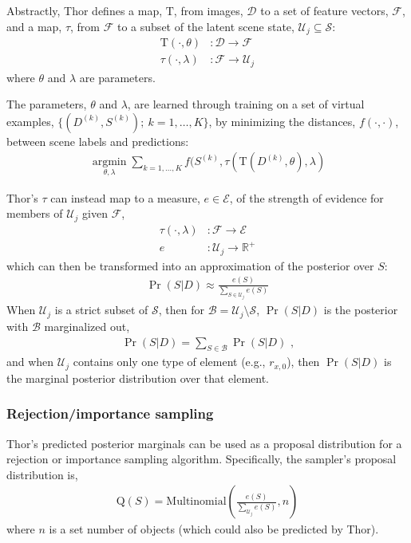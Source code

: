 \documentclass[]{report}
\begin{document}
Abstractly, Thor defines a map, $\mathrm{T}$, from images,
$\mathcal{D}$ to a set of feature vectors, $\mathcal{F}$, and a map,
$\tau$, from $\mathcal{F}$ to a subset of the latent scene state,
$\mathcal{U}_j \subseteq \mathcal{S}$:
\begin{align*}
  \mathrm{T}(\cdot, \theta) &: \mathcal{D} \rightarrow \mathcal{F}\\
  \tau(\cdot, \lambda) &: \mathcal{F} \rightarrow \mathcal{U}_j
\end{align*}
where $\theta$ and $\lambda$ are parameters.

The parameters, $\theta$ and $\lambda$, are learned through training
on a set of virtual examples, $\{(D^{(k)}, S^{(k)});\ k=1, \dots,
K\}$, by minimizing the distances, $f(\cdot,\cdot)$, between scene
labels and predictions:
\begin{align*}
  \underset{\theta, \lambda}{\operatorname{argmin}} \sum_{k=1, \dots, K}
  f(S^{(k)}, \tau(\mathrm{T}(D^{(k)}, \theta), \lambda)
\end{align*}

Thor's $\tau$ can instead map to a measure, $e \in \mathcal{E}$, of
the strength of evidence for members of $\mathcal{U}_j$ given
$\mathcal{F}$,
\begin{align*}
  \tau(\cdot, \lambda) &: \mathcal{F} \rightarrow \mathcal{E}\\
  e &: \mathcal{U}_j \rightarrow \mathbb{R}^+
\end{align*}
which can then be transformed into an approximation of the posterior
over $S$:
\begin{align*}
  \Pr(S|D) \approx \frac{e(S)}{\sum_{S \in \mathcal{U}_j} e(S)}
\end{align*}
When $\mathcal{U}_j$ is a strict subset of $\mathcal{S}$, then for
$\mathcal{B} = \mathcal{U}_j \setminus \mathcal{S}$, $\Pr(S|D)$ is the
posterior with $\mathcal{B}$ marginalized out,
\begin{align*}
  \Pr(S|D) = \sum_{S \in \mathcal{B}} \Pr(S|D) \text{ ,}
\end{align*}
and when $\mathcal{U}_j$ contains only one type of element (e.g.,
$r_{x,0}$), then $\Pr(S|D)$ is the marginal posterior distribution
over that element.


\subsubsection*{Rejection/importance sampling}
Thor's predicted posterior marginals can be used as a proposal
distribution for a rejection or importance sampling
algorithm. Specifically, the sampler's proposal distribution is,
\begin{align*}
  \mathrm{Q}(S) =
  \mathrm{Multinomial}\left(\frac{e(S)}{\sum_{\mathcal{U}_j} e(S)} , n
  \right)
\end{align*}
where $n$ is a set number of objects (which could also be predicted by
Thor).
\end{document}
